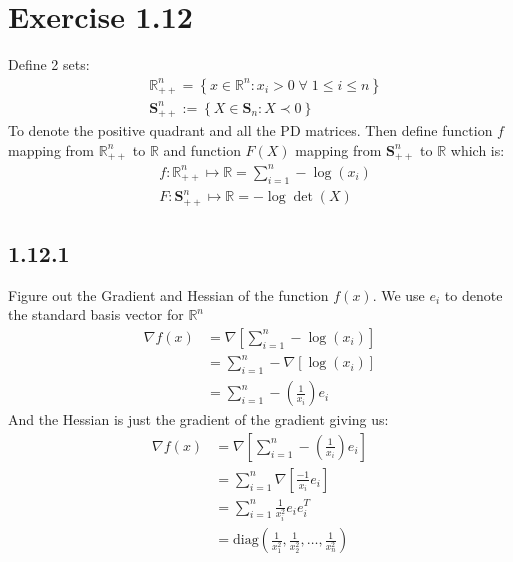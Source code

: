 \documentclass[]{article}
\begin{document}
\section*{Exercise 1.12}        
    Define 2 sets: 
    \begin{align*}\tag{1.12.1.0.1}\label{eqn:1.12.0.1}
        & \mathbb{R}_{++}^n = \left\lbrace
            x \in \mathbb{R}^n: x_i > 0 \; \forall \; 1 \le i \le n
        \right\rbrace
        \\
        & \mathbf{S}_{++}^n := \left\lbrace
            X \in \mathbf{S}_n: X \prec 0
        \right\rbrace
    \end{align*}
    To denote the positive quadrant and all the PD matrices. Then define function $f$ mapping from $\mathbb{R}_{++}^n$ to $\mathbb{R}$ and function $F(X)$ mapping from $\mathbf{S}_{++}^n$ to $\mathbb{R}$ which is: 
    \begin{align*}\tag{1.12.0.2}\label{eqn:1.12.0.2}
        & f: \mathbb{R}_{++}^n\mapsto \mathbb{R}  = \sum_{i = 1}^{n} - \log(x_i) 
        \\
        & 
        F:\mathbf{S}_{++}^n \mapsto \mathbb{R} = - \log \det(X)
    \end{align*}
    \subsection*{1.12.1}
        Figure  out the Gradient and Hessian of the function $f(x)$. We use $e_i$ to denote the standard basis vector for $\mathbb{R}^n$
        \begin{align*}\tag{1.12.2.1}\label{eqn:1.12.2.1}
            \nabla f(x) &= \nabla \left[
                \sum_{i = 1}^{n}-\log (x_i)
            \right]
            \\
            &= \sum_{i = 1}^{n}-\nabla \left[
                \log(x_i)
            \right]
            \\
            &= \sum_{i = 1}^{n} - \left(
                \frac{1}{x_i}
            \right)e_i
        \end{align*}
        And the Hessian is just the gradient of the gradient giving us: 
        \begin{align*}\tag{1.12.2.2}\label{eqn:1.12.2.2}
            \nabla f(x) &= \nabla\left[
                \sum_{i = 1}^{n} -\left(
                    \frac{1}{x_i}
                \right)e_i
            \right]
            \\
            &= 
            \sum_{i = 1}^{n} \nabla\left[
                \frac{-1}{x_i} e_i
            \right]
            \\
            &= 
            \sum_{i = 1}^{n} \frac{1}{x_i^2} e_i e_i^T
            \\
            &= \text{diag}\left(\frac{1}{x_1^2}, \frac{1}{x_2^2}, \dots, \frac{1}{x_n^2}\right)
        \end{align*}
\end{document}
